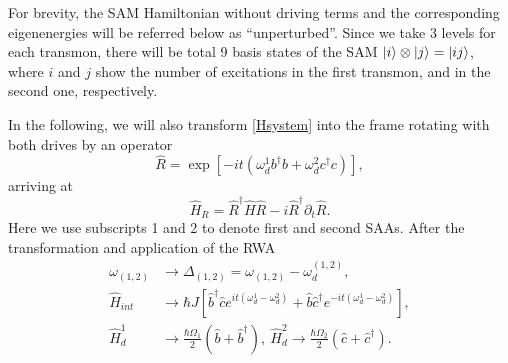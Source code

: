 \documentclass[%
 pra,
 amsmath,amssymb,
 reprint,%
]{revtex4-1}
\begin{document}
For brevity, the SAM Hamiltonian without driving 
terms and the corresponding eigenenergies will be 
referred below as ``unperturbed''. Since we take 
3 levels for each transmon, there will be total 9 
basis states of the SAM $\ket{i}\otimes \ket{j} = 
\ket{ij}$, where $i$ and $j$ show the number of 
excitations in the first transmon, and in the 
second one, respectively.


In the following, we will also transform 
\autoref{Hsystem} into the frame rotating with 
both drives by an operator
\begin{equation}
\hat R = \exp[-i t (\omega_d^1 
b^{\dagger}b+\omega_d^2 
c^{\dagger}c)],\label{eq:R}
\end{equation}
arriving at
\begin{equation}
\hat H_R = \hat R^{\dagger}\hat H \hat R -	 
{i}\hat R^{\dagger}\partial_t \hat 
R.\label{eq:rotation}
\end{equation}
Here we use subscripts 1 and 2 to denote first and second SAAs. After the transformation and application of the RWA
\begin{equation}
\begin{aligned}
	\omega_{(1,2)} &\rightarrow \Delta_{(1,2)} = \omega_{(1,2)} - \omega_d^{(1,2)},\\
	\hat H_{int} &\rightarrow \hbar J \left[\hat 
	b^\dag \hat c e^{it(\omega_d^1 - \omega_d^2)} 
	+ \hat b \hat c^\dag e^{-it(\omega_d^1 - 
	\omega_d^2)}\right],\\
	\hat H_{d}^1 &\rightarrow \frac{\hbar \Omega_1}{2}(\hat b  + \hat b^\dag),\ 	\hat H_{d}^2 \rightarrow \frac{\hbar \Omega_2}{2}(\hat c  + \hat c^\dag).
\end{aligned}
\label{eq:RWA}
\end{equation}
\end{document}
